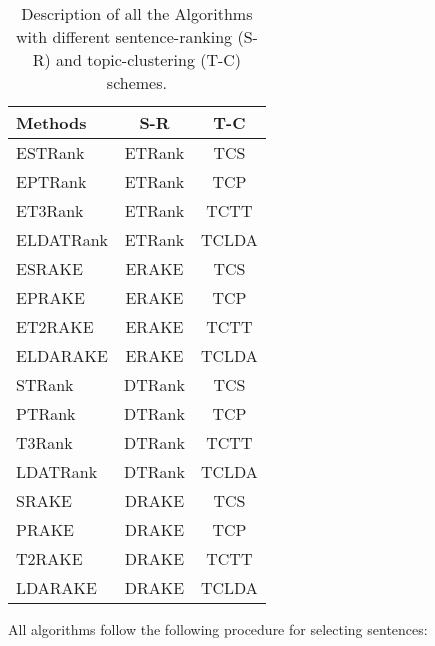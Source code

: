\documentclass[a4paper,twoside]{article}
\begin{document}
\begin{table}[h]
\begin{center}
\caption{\label{algorithm_names} Description of all the Algorithms with different sentence-ranking (S-R) and topic-clustering (T-C) schemes.}
\begin{tabular}{l|c|c}
\hline
\bf Methods & \bf S-R & \bf T-C \\
\hline
ESTRank & ETRank & TCS \\
EPTRank & ETRank & TCP \\
ET3Rank & ETRank & TCTT \\
ELDATRank & ETRank & TCLDA \\
\hline
ESRAKE & ERAKE & TCS \\
EPRAKE & ERAKE & TCP \\
ET2RAKE & ERAKE & TCTT \\
ELDARAKE & ERAKE & TCLDA \\
\hline
STRank & DTRank & TCS \\
PTRank & DTRank & TCP \\
T3Rank & DTRank & TCTT \\
LDATRank & DTRank & TCLDA \\
\hline
SRAKE & DRAKE & TCS \\
PRAKE & DRAKE & TCP \\
T2RAKE & DRAKE & TCTT \\
LDARAKE & DRAKE & TCLDA \\
\hline
\end{tabular}
\end{center}
\end{table}

All algorithms follow the following procedure for selecting sentences:
\end{document}
